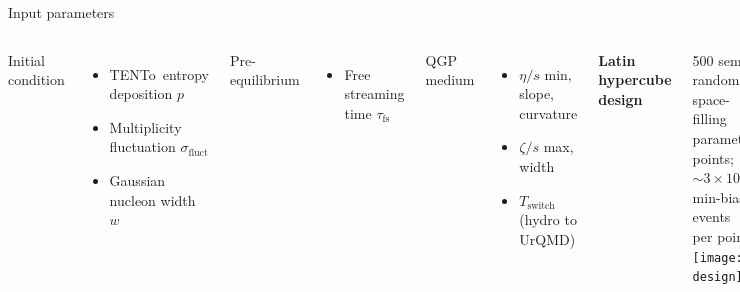 \documentclass{beamer}
\newcommand{\trento}{T\raisebox{-.5ex}{R}ENTo}
\begin{document}
\begin{frame}{Input parameters}
  \begin{columns}
    Initial condition
    \begin{itemize}
      \item \trento\ entropy deposition $p$
      \item Multiplicity fluctuation $\sigma_\text{fluct}$
      \item Gaussian nucleon width $w$
    \end{itemize}
    \medskip
    Pre-equilibrium
    \begin{itemize}
      \item Free streaming time $\tau_\text{fs}$
    \end{itemize}
    \medskip
    QGP medium
    \begin{itemize}
      \item $\eta/s$ min, slope, curvature
      \item $\zeta/s$ max, width
      \item $T_\text{switch}$ (hydro to UrQMD)
    \end{itemize}
    \begin{center}
      \textbf{Latin hypercube design}
    \end{center}
    500 semi-random, space-filling parameter points;
    ${\sim}3 \times 10^4$ min-bias events per point \\[1em]
    \texttt{[image: design]}
  \end{columns}
\end{frame}
\end{document}
